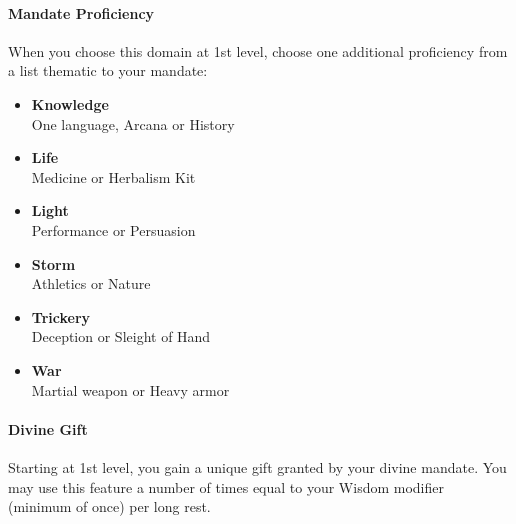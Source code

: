 \paragraph{Mandate
Proficiency}\label{Sacred_Mandate_mandate-proficiency}

When you choose this domain at 1st level, choose one additional
proficiency from a list thematic to your mandate:

\begin{itemize}
\item
  \textbf{Knowledge}\\
  One language, Arcana or History
\item
  \textbf{Life}\\
  Medicine or Herbalism Kit
\item
  \textbf{Light}\\
  Performance or Persuasion
\item
  \textbf{Storm}\\
  Athletics or Nature
\item
  \textbf{Trickery}\\
  Deception or Sleight of Hand
\item
  \textbf{War}\\
  Martial weapon or Heavy armor
\end{itemize}

\paragraph{Divine Gift}\label{Sacred_Mandate_divine-gift}

Starting at 1st level, you gain a unique gift granted by your divine
mandate. You may use this feature a number of times equal to your Wisdom
modifier (minimum of once) per long rest.

